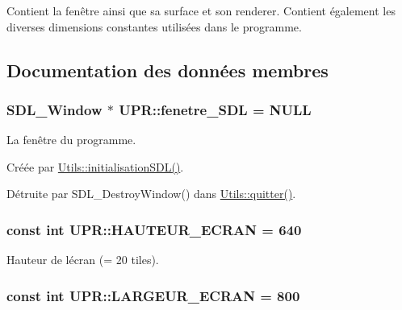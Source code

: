 Contient la fenêtre ainsi que sa surface et son renderer. Contient également les diverses dimensions constantes utilisées dans le programme. 

\subsection{Documentation des données membres}
\hypertarget{class_u_p_r_a337a823f61ad23359193a2d031d3376e}{}
\subsubsection[{fenetre\+\_\+\+S\+D\+L}]{\setlength{\rightskip}{0pt plus 5cm}S\+D\+L\+\_\+\+Window $\ast$ U\+P\+R\+::fenetre\+\_\+\+S\+D\+L = N\+U\+L\+L\hspace{0.3cm}{\ttfamily [static]}}\label{class_u_p_r_a337a823f61ad23359193a2d031d3376e}


La fenêtre du programme. 

Créée par \hyperlink{class_utils_a65fa5f629d47909dcd35b7194a394df5}{Utils\+::initialisation\+S\+D\+L()}.

Détruite par S\+D\+L\+\_\+\+Destroy\+Window() dans \hyperlink{class_utils_a1a1317e9deaac6dc1ad285d101b6f929}{Utils\+::quitter()}. \hypertarget{class_u_p_r_a68b3cf191ad71e0bea073c214f47b760}{}
\subsubsection[{H\+A\+U\+T\+E\+U\+R\+\_\+\+E\+C\+R\+A\+N}]{\setlength{\rightskip}{0pt plus 5cm}const int U\+P\+R\+::\+H\+A\+U\+T\+E\+U\+R\+\_\+\+E\+C\+R\+A\+N = 640\hspace{0.3cm}{\ttfamily [static]}}\label{class_u_p_r_a68b3cf191ad71e0bea073c214f47b760}


Hauteur de l\textquotesingle{}écran (= 20 tiles). 

\hypertarget{class_u_p_r_a29b280f8a41e96854465f42ce303520b}{}
\subsubsection[{L\+A\+R\+G\+E\+U\+R\+\_\+\+E\+C\+R\+A\+N}]{\setlength{\rightskip}{0pt plus 5cm}const int U\+P\+R\+::\+L\+A\+R\+G\+E\+U\+R\+\_\+\+E\+C\+R\+A\+N = 800\hspace{0.3cm}{\ttfamily [static]}}\label{class_u_p_r_a29b280f8a41e96854465f42ce303520b}


